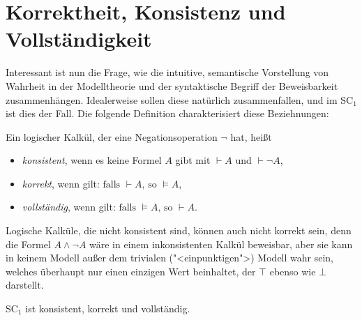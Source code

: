 \section{Korrektheit, Konsistenz und Vollständigkeit}
\label{sec:kkv}

Interessant ist nun die Frage, wie die intuitive, semantische Vorstellung
von Wahrheit in der Modelltheorie und der syntaktische Begriff der
Beweisbarkeit zusammenhängen.  Idealerweise sollen diese natürlich
zusammenfallen, und im SC$_1$ ist dies der Fall.  
Die folgende 
Definition charakterisiert diese Beziehnungen:

\begin{definition}
%
Ein logischer Kalkül, der eine Negationsoperation $\neg$ hat, heißt 
\begin{itemize}
\item \textit{konsistent},
  wenn es keine Formel $A$ gibt mit $\vdash A$ und 
  $\vdash \neg A$,
\item \textit{korrekt}, wenn gilt:
  \(
    \textrm{falls } \vdash A \textrm{, so } \models A
    \),
\item  \textit{vollständig}, wenn gilt:
  \(
    \textrm{falls } \models A \textrm{, so } \vdash A
    \).
\end{itemize}
\end{definition}
                                

Logische Kalküle, die nicht konsistent sind, können auch nicht
korrekt sein, denn die Formel $A\wedge\neg A$ wäre in einem inkonsistenten
Kalkül beweisbar, aber sie kann in keinem Modell außer dem trivialen
("<einpunktigen">) Modell wahr sein, welches überhaupt nur einen einzigen Wert
beinhaltet, der $\top$ ebenso wie $\bot$ darstellt.
%
\begin{satz}
  SC$_1$ ist konsistent, korrekt und vollständig.
\end{satz}

